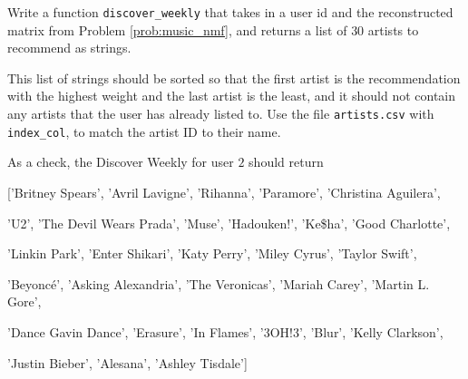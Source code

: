 \begin{problem}
Write a function \texttt{discover\_weekly} that takes in a user id and the reconstructed matrix from Problem \ref{prob:music_nmf}, and returns a list of $30$ artists to recommend as strings.

This list of strings should be sorted so that the first artist is the recommendation with the highest weight and the last artist is the least, and it should not contain any artists that the user has already listed to.
Use the file \texttt{artists.csv} with \texttt{index\_col}, to match the artist ID to their name.

\noindent As a check, the Discover Weekly for user $2$ should return

['Britney Spears', 'Avril Lavigne', 'Rihanna', 'Paramore', 'Christina Aguilera',

'U2', 'The Devil Wears Prada', 'Muse', 'Hadouken!', 'Ke\$ha', 'Good Charlotte',

'Linkin Park', 'Enter Shikari', 'Katy Perry', 'Miley Cyrus', 'Taylor Swift',

'Beyoncé', 'Asking Alexandria', 'The Veronicas', 'Mariah Carey', 'Martin L. Gore',

'Dance Gavin Dance', 'Erasure', 'In Flames', '3OH!3', 'Blur', 'Kelly Clarkson',

'Justin Bieber', 'Alesana', 'Ashley Tisdale']










\end{problem}
